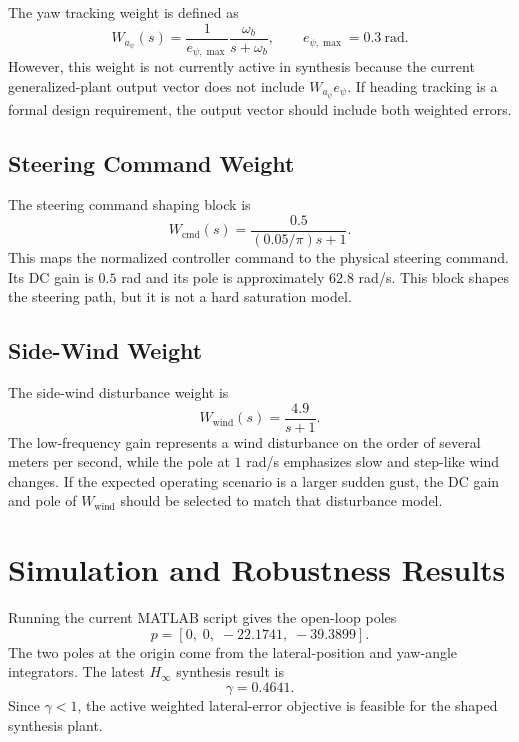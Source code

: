 \documentclass[10pt,twocolumn]{article}
\begin{document}
The yaw tracking weight is defined as
\begin{equation}
    W_{a_\psi}(s)
    =
    \frac{1}{e_{\psi,\max}}
    \frac{\omega_b}{s+\omega_b},
    \qquad
    e_{\psi,\max}=0.3~\mathrm{rad}.
\end{equation}
However, this weight is not currently active in synthesis because the current
generalized-plant output vector does not include $W_{a_\psi}e_\psi$. If heading
tracking is a formal design requirement, the output vector should include both
weighted errors.

\subsection{Steering Command Weight}

The steering command shaping block is
\begin{equation}
    W_{\mathrm{cmd}}(s)
    =
    \frac{0.5}{(0.05/\pi)s+1}.
\end{equation}
This maps the normalized controller command to the physical steering command.
Its DC gain is $0.5$ rad and its pole is approximately $62.8$ rad/s. This block
shapes the steering path, but it is not a hard saturation model.

\subsection{Side-Wind Weight}

The side-wind disturbance weight is
\begin{equation}
    W_{\mathrm{wind}}(s)
    =
    \frac{4.9}{s+1}.
\end{equation}
The low-frequency gain represents a wind disturbance on the order of several
meters per second, while the pole at $1$ rad/s emphasizes slow and step-like
wind changes. If the expected operating scenario is a larger sudden gust, the
DC gain and pole of $W_{\mathrm{wind}}$ should be selected to match that
disturbance model.

\section{Simulation and Robustness Results}

Running the current MATLAB script gives the open-loop poles
\begin{equation}
    p =
    \left[
        0,\;0,\;-22.1741,\;-39.3899
    \right].
\end{equation}
The two poles at the origin come from the lateral-position and yaw-angle
integrators. The latest $H_\infty$ synthesis result is
\begin{equation}
    \gamma = 0.4641.
\end{equation}
Since $\gamma<1$, the active weighted lateral-error objective is feasible for
the shaped synthesis plant.
\end{document}
